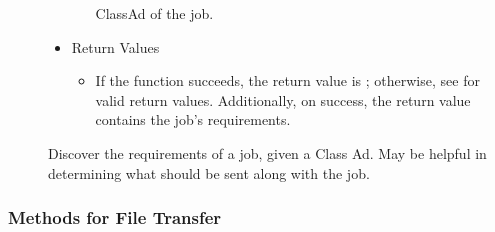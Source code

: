 \begin{description}
\begin{itemize}
\begin{itemize}
      ClassAd of the job.
    \end{itemize}
    \item[] Return Values
    \begin{itemize}
      \item[] If the function succeeds, the return value is ; 
      otherwise, see  for valid return values. Additionally,
      on success, the return value contains the job's requirements.
    \end{itemize}
  \end{itemize}    

  Discover the requirements of a job, given a Class Ad.  May be helpful 
  in determining what should be sent along with the job. 

\end{description}

\subsubsection{\label{WebService-FileTransfer} Methods for File Transfer}

